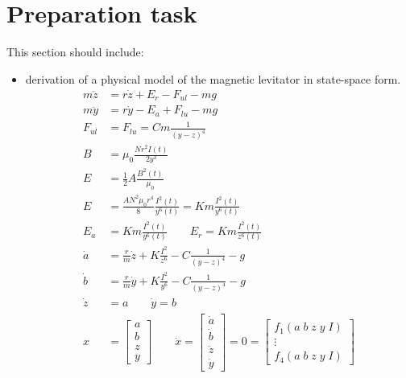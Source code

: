 \documentclass[10pt,a4paper]{article}
\begin{document}
\begin{titlepage}

\end{titlepage}
\newpage
\pagestyle{plain}

\section{Preparation task}
This section should include:
\begin{itemize}
    \item derivation of a physical model of the magnetic levitator in state-space form.
	\begin{align*}
		m \ddot{z} &= r \dot{z} + E_{r} - F_{ul} - mg \\
		m \ddot{y} &= r \dot{y} - E_{a} + F_{lu} - mg \\
		F_{ul} &= F_{lu} = C m \frac{1}{(y - z)^{4}} \\
		B &= \mu_{0} \frac{N r^{2} I(t)}{2 y^{3}} \\
		E &= \frac{1}{2} A \frac{B^{2}(t)}{\mu_{0}} \\
		E &= \frac{A N^{2} \mu_{0} r^{4}}{8} \frac{I^{2}(t)}{y^{6}(t)} = K m \frac{I^{2}(t)}{y^{6}(t)} \\
		E_{a} &= K m \frac{I^{2}(t)}{y^{6}(t)} \qquad E_{r} = K m \frac{I^{2}(t)}{z^{6}(t)} \\
		\dot{a} &= \frac{r}{m} \dot{z} + K \frac{I^{2}}{z^{6}} - C \frac{1}{(y - z)^{4}} - g \\
		\dot{b} &= \frac{r}{m} \dot{y} + K \frac{I^{2}}{y^{6}} - C \frac{1}{(y - z)^{4}} - g \\
		\dot{z} &= a \qquad \dot{y} = b \\
		x &= \begin{bmatrix} a \\ b \\ z \\ y \end{bmatrix} \qquad \dot{x} = \begin{bmatrix} \dot{a} \\ \dot{b} \\ \dot{z} \\ \dot{y} \end{bmatrix} = 0 = \begin{bmatrix} f_{1}(a \; b \; z \; y \; I) \\ \vdots \\ f_{4}(a \; b \; z \; y \; I) \end{bmatrix} \\

\end{align*}
\end{itemize}
\end{document}
